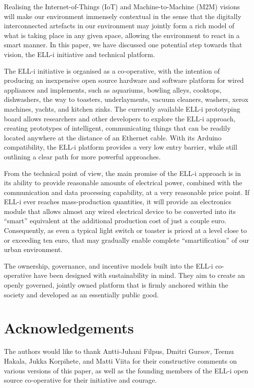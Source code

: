 \documentclass{siamltex}
\begin{document}
Realising the Internet-of-Things (IoT) and Machine-to-Machi\-ne (M2M)
visions will make our environment immensely contextual in the sense
that the digitally interconnected artefacts in our environment may
jointly form a rich model of what is taking place in any given space,
allowing the environment to react in a smart manner.  In this paper,
we have discussed one potential step towards that vision, the ELL-i
initiative and technical platform.

The ELL-i initiative is organised as a co-operative, with the
intention of producing an inexpensive open source hardware and software
platform for wired appliances and implements, such as aquariums, bowling
alleys, cooktops, dishwashers, the way to toasters, underlayments,
vacuum cleaners, washers, xerox machines, yachts, and kitchen zinks.
The currently available ELL-i prototyping board allows researchers and
other developers to explore the ELL-i approach, creating prototypes of
intelligent, communicating things that can be readily located anywhere
at the distance of an Ethernet cable.  With its Arduino compatibility,
the ELL-i platform provides a very low entry barrier, while still
outlining a clear path for more powerful approaches.

From the technical point of view, the main promise of the ELL-i
approach is in its ability to provide reasonable amounts of electrical
power, combined with the communication and data processing capability,
at a very reasonable price point.  If ELL-i ever reaches
mass-production quantities, it will provide an electronics module that
allows almost any wired electrical device to be converted into its
``smart'' equivalent at the additional production cost of just a
couple euro.  Consequently, as even a typical light switch or toaster
is priced at a level close to or exceeding ten euro, that may
gradually enable complete ``smartification'' of our urban
environment. 

The ownership, governance, and incentive models built into the ELL-i
co-operative have been designed with sustainability in mind.  They aim
to create an openly governed, jointly owned platform that is firmly
anchored within the society and developed as an essentially public good.

\section*{Acknowledgements}

The authors would like to thank Antti-Juhani Filpus, Dmitri Gursov,
Teemu Hakala, Jukka Korpihete, and Matti Viita for their constructive
comments on various versions of this paper, as well as the founding
members of the ELL-i open source co-operative for their initiative and
courage.

{}

\end{document}
